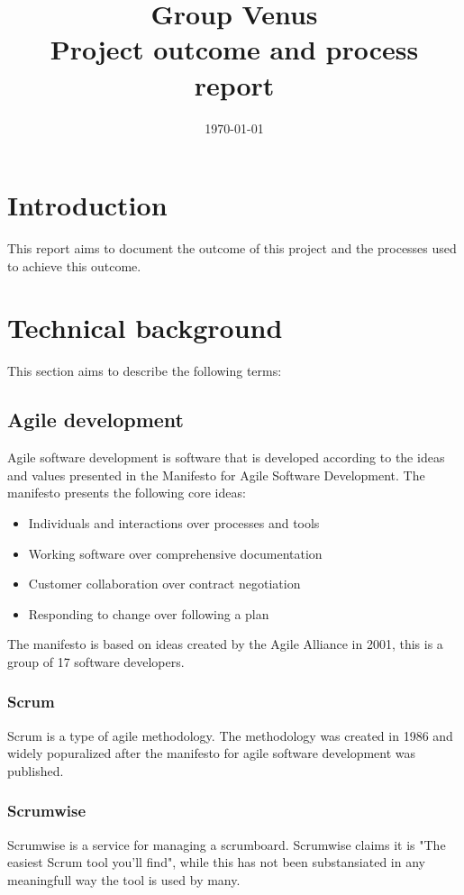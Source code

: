 \documentclass[12pt]{article}
\title{\textbf{Group Venus} \\ Project outcome and process report}
\date{\today}
\begin{document}
\subsectionfont{\fontsize{12}{14}\selectfont}

\maketitle

\pagebreak

\tableofcontents



\section{Introduction}
This report aims to document the outcome of this project and the processes used to achieve this outcome.
\section{Technical background}
This section aims to describe the following terms:
\subsection{Agile development\cite{AgileSoftwareDevelopment2024}}
Agile software development is software that is developed according to the ideas and values presented in the 
Manifesto for Agile Software Development\cite{ManifestoAgileSoftware}.
The manifesto presents the following core ideas:
\begin{itemize}
    \item Individuals and interactions over processes and tools
    \item Working software over comprehensive documentation
    \item Customer collaboration over contract negotiation
    \item Responding to change over following a plan
\end{itemize}
The manifesto is based on ideas created by the Agile Alliance in 2001, 
this is a group of 17 software developers.
\subsubsection{Scrum\cite{Scrum2023}}
Scrum is a type of agile methodology. The methodology was created in 1986 and widely popuralized 
after the manifesto for agile software development was published.
\subsubsection{Scrumwise\cite{scrumwiseScrumToolsScrum}}
Scrumwise is a service for managing a scrumboard. Scrumwise claims it is "The easiest Scrum tool you'll find", 
while this has not been substansiated in any meaningfull way the tool is used by many.
\end{document}

